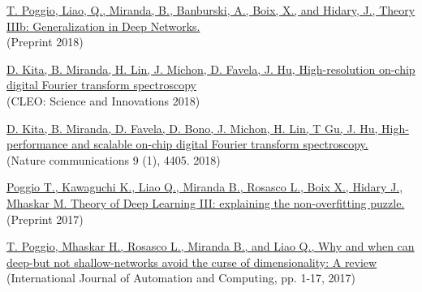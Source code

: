 \documentclass{article}
\newenvironment{changemargin}[2]{%
  \begin{list}{}{%
    \setlength{\topsep}{0pt}%
    \setlength{\leftmargin}{#1}%
    \setlength{\rightmargin}{#2}%
    \setlength{\listparindent}{\parindent}%
    \setlength{\itemindent}{\parindent}%
    \setlength{\parsep}{\parskip}%
  }%
  \item[]}{\end{list}
}
\newenvironment{body} {
	\vspace*{-16pt}
	\begin{changemargin}{-0.25in}{-0.5in}
  }	
	{\end{changemargin}
}
\begin{document}
\begin{body}
    \vspace{10pt}
    \href{https://arxiv.org/abs/1806.11379}{T. Poggio, Liao, Q., Miranda, B., Banburski, A., Boix, X., and Hidary, J., Theory IIIb: Generalization in Deep Networks.}
    \\
    (Preprint 2018)
    
    \vspace{10pt}
    \href{https://www.osapublishing.org/abstract.cfm?uri=CLEO_SI-2018-SF1A.1}{D. Kita, B. Miranda, H. Lin, J. Michon, D. Favela, J. Hu, High-resolution on-chip digital Fourier transform spectroscopy}
    \\
    (CLEO: Science and Innovations 2018)
    
    \vspace{10pt}
    \href{https://www.nature.com/articles/s41467-018-06773-2}{D. Kita, B. Miranda, D. Favela, D. Bono, J. Michon, H. Lin, T Gu, J. Hu, High-performance and scalable on-chip digital Fourier transform spectroscopy.}
    \\
    (Nature communications 9 (1), 4405. 2018)
    
    
    \vspace{10pt}
    \href{https://arxiv.org/abs/1801.00173}{Poggio T., Kawaguchi K., Liao Q., Miranda B., Rosasco L., Boix X., Hidary J., Mhaskar M. Theory of Deep Learning III: explaining the non-overfitting puzzle.}
    \\
    (Preprint 2017)
    
    \vspace{12pt}
    \href{https://link.springer.com/article/10.1007/s11633-017-1054-2}{T. Poggio, Mhaskar H., Rosasco L., Miranda B., and Liao Q., Why and when can deep-but not shallow-networks avoid the curse of dimensionality: A review}
    \\
    (International Journal of Automation and Computing, pp. 1-17, 2017)
    
    

\end{body}
\end{document}
